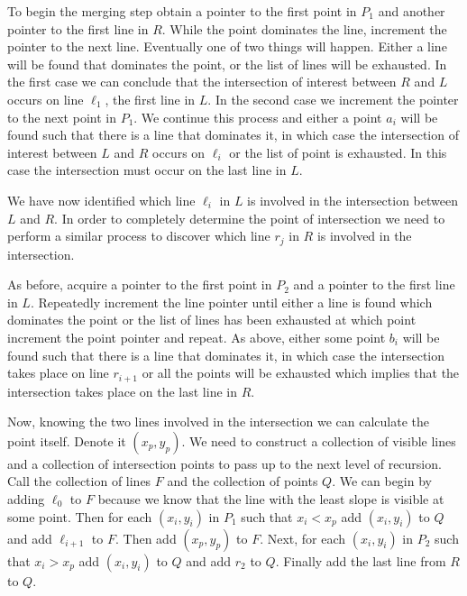 \documentclass{article}
\begin{document}
To begin the merging step obtain a pointer to the first point in $P_1$ and another pointer to the first line in $R$. While the point dominates the line, increment the pointer to the next line. Eventually one of two things will happen. Either a line will be found that dominates the point, or the list of lines will be exhausted. In the first case we can conclude that the intersection of interest between $R$ and $L$ occurs on line $\ell_1$, the first line in $L$. In the second case we increment the pointer to the next point in $P_1$. We continue this process and either a point $a_i$ will be found such that there is a line that dominates it, in which case the intersection of interest between $L$ and $R$ occurs on $\ell_i$ or the list of point is exhausted. In this case the intersection must occur on the last line in $L$. 

We have now identified which line $\ell_i$ in $L$ is involved in the intersection between $L$ and $R$. In order to completely determine the point of intersection we need to perform a similar process to discover which line $r_j$ in $R$ is involved in the intersection.

As before, acquire a pointer to the first point in $P_2$ and a pointer to the first line in $L$. Repeatedly increment the line pointer until either a line is found which dominates the point or the list of lines has been exhausted at which point increment the point pointer and repeat. As above, either some point $b_i$ will be found such that there is a line that dominates it, in which case the intersection takes place on line $r_{i+1}$ or all the points will be exhausted which implies that the intersection takes place on the last line in $R$. 

Now, knowing the two lines involved in the intersection we can calculate the point itself. Denote it $(x_p, y_p)$. We need to construct a collection of visible lines and a collection of intersection points to pass up to the next level of recursion. Call the collection of lines $F$ and the collection of points $Q$. We can begin by adding $\ell_0$ to $F$ because we know that the line with the least slope is visible at some point. Then for each $(x_i, y_i)$ in $P_1$ such that $x_i < x_p$ add $(x_i, y_i)$ to $Q$ and add $\ell_{i+1}$ to $F$. Then add $(x_p, y_p)$ to $F$. Next, for each $(x_i, y_i)$ in $P_2$ such that $x_i > x_p$ add $(x_i, y_i)$ to $Q$ and add $r_2$ to $Q$. Finally add the last line from $R$ to $Q$. 
\end{document}
